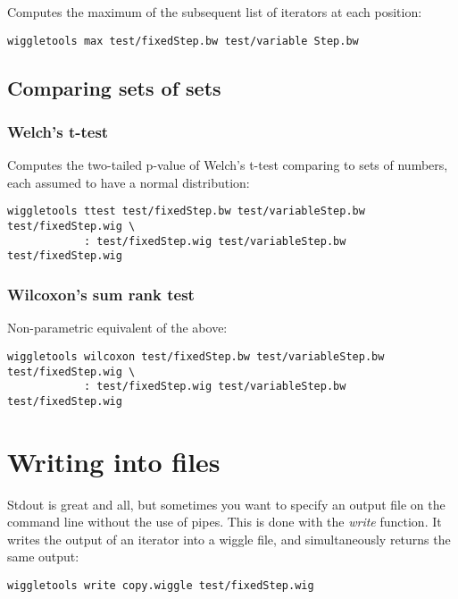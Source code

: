 \documentclass[12pt]{article}
\begin{document}
Computes the maximum of the subsequent list of iterators at each position:

\begin{verbatim}
wiggletools max test/fixedStep.bw test/variable Step.bw 
\end{verbatim}

\subsection{Comparing sets of sets}

\subsubsection{Welch's t-test}

Computes the two-tailed p-value of Welch's t-test comparing to sets of numbers, each assumed to have a normal distribution:

\begin{verbatim}
wiggletools ttest test/fixedStep.bw test/variableStep.bw test/fixedStep.wig \
            : test/fixedStep.wig test/variableStep.bw test/fixedStep.wig
\end{verbatim}

\subsubsection{Wilcoxon's sum rank test}

Non-parametric equivalent of the above:

\begin{verbatim}
wiggletools wilcoxon test/fixedStep.bw test/variableStep.bw test/fixedStep.wig \
            : test/fixedStep.wig test/variableStep.bw test/fixedStep.wig
\end{verbatim}

\section{Writing into files}

Stdout is great and all, but sometimes you want to specify an output file on the command line without the use of pipes. This is done with the \emph{write} function. It writes the output of an iterator into a wiggle file, and simultaneously returns the same output:

\begin{verbatim}
wiggletools write copy.wiggle test/fixedStep.wig 
\end{verbatim}
\end{document}
